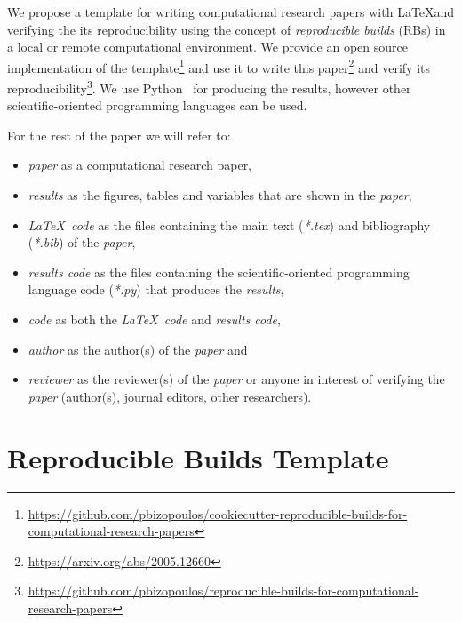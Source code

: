 \documentclass[journal]{IEEEtran}
\begin{document}
We propose a template for writing computational research papers with \LaTeX and verifying the its reproducibility using the concept of \textit{reproducible builds} (RBs) in a local or remote computational environment.
We provide an open source implementation of the template\footnote{\url{https://github.com/pbizopoulos/cookiecutter-reproducible-builds-for-computational-research-papers}} and use it to write this paper\footnote{\url{https://arxiv.org/abs/2005.12660}} and verify its reproducibility\footnote{\url{https://github.com/pbizopoulos/reproducible-builds-for-computational-research-papers}}.
We use Python~\cite{van2007python} for producing the results, however other scientific-oriented programming languages can be used.

For the rest of the paper we will refer to:
\begin{itemize}
	\item \textit{paper} as a computational research paper,
	\item \textit{results} as the figures, tables and variables that are shown in the \textit{paper},
	\item \textit{\LaTeX\ code} as the files containing the main text (\textit{*.tex}) and bibliography (\textit{*.bib}) of the \textit{paper},
	\item \textit{results code} as the files containing the scientific-oriented programming language code (\textit{*.py}) that produces the \textit{results},
	\item \textit{code} as both the \textit{\LaTeX\ code} and \textit{results code},
	\item \textit{author} as the author(s) of the \textit{paper} and
	\item \textit{reviewer} as the reviewer(s) of the \textit{paper} or anyone in interest of verifying the \textit{paper} (author(s), journal editors, other researchers).
\end{itemize}

\section{Reproducible Builds Template}
\end{document}
